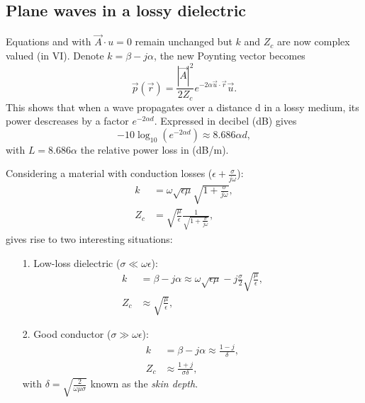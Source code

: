 \documentclass[a4paper, 10pt]{article}
\begin{document}
    \subsection*{Plane waves in a lossy dielectric}
    Equations  and  with $\vec{A}\cdot u=0$ remain unchanged but $k$ and $Z_c$ are now complex valued (in VI). 
    Denote $k=\beta-j\alpha$, the new Poynting vector becomes 
    \begin{equation}\vec{p}(\vec{r})=\frac{|\vec{A}|^2}{2Z_c}e^{-2\alpha\vec{u}\cdot\vec{r}}\vec{u}.\label{H5eq4}\end{equation}
    This shows that when a wave propagates over a distance d in a lossy medium, its power descreases by a factor $e^{-2\alpha d}$. Expressed in decibel (dB) gives
    \begin{equation}-10\log_{10}(e^{-2\alpha d})\approx 8.686\alpha d,\label{H5eq5}\end{equation} with $L=8.686\alpha$ the relative power loss in (dB/m).

    Considering a material with conduction losses ($\epsilon + \frac{\sigma}{j\omega}$):
    \begin{align}
        k & = \omega\sqrt{\epsilon\mu}\sqrt{1+\frac{\sigma}{j\omega}}\label{H5eq6},\\
        Z_c & = \sqrt{\frac{\mu}{\epsilon}}\frac{1}{\sqrt{1+\frac{\sigma}{j\omega}}}\label{H5eq7},
    \end{align}
    gives rise to two interesting situations:
    \begin{itemize}
        \item[1.] Low-loss dielectric ($\sigma \ll \omega\epsilon$):
        \begin{align}
            k & = \beta - j\alpha \approx \omega\sqrt{\epsilon\mu} - j\frac{\sigma}{2}\sqrt{\frac{\mu}{\epsilon}} \label{H5eq8},\\
            Z_c & \approx \sqrt{\frac{\mu}{\epsilon}} \label{H5eq9},
        \end{align}
        \item[2.] Good conductor ($\sigma \gg \omega\epsilon$):
        \begin{align}
            k & = \beta - j\alpha \approx \frac{1-j}{\delta} \label{H5eq10},\\
            Z_c & \approx \frac{1+j}{\sigma\delta} \label{H5eq11},
        \end{align}
        with $\delta = \sqrt{\frac{2}{\omega\mu\sigma}}$ known as the \textit{skin depth}.
    \end{itemize}
\end{document}
